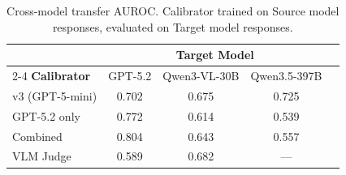 \begin{table}[t]
\centering
\caption{Cross-model transfer AUROC. Calibrator trained on Source model responses, evaluated on Target model responses.}
\label{tab:cross_model}
\begin{tabular}{lcccc}
\toprule
& \multicolumn{3}{c}{\textbf{Target Model}} \\
\cmidrule(lr){2-4}
\textbf{Calibrator} & GPT-5.2 & Qwen3-VL-30B & Qwen3.5-397B \\
\midrule
v3 (GPT-5-mini) & 0.702 & 0.675 & 0.725 \\
GPT-5.2 only & 0.772 & 0.614 & 0.539 \\
Combined & 0.804 & 0.643 & 0.557 \\
\midrule
VLM Judge & 0.589 & 0.682 & --- \\
\bottomrule
\end{tabular}
\end{table}